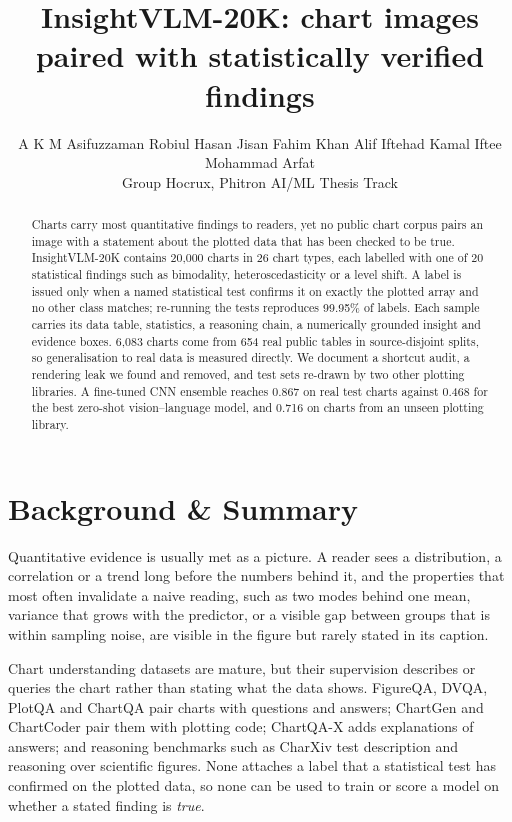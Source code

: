 \documentclass[11pt,a4paper]{article}
\title{\textbf{InsightVLM-20K: chart images paired with statistically verified findings}}
\author{A K M Asifuzzaman \quad Robiul Hasan Jisan \quad Fahim Khan Alif \quad Iftehad Kamal Iftee \quad Mohammad Arfat\\[0.3em]
\small Group Hocrux, Phitron AI/ML Thesis Track}
\date{}
\begin{document}
\maketitle

\begin{abstract}
\noindent
Charts carry most quantitative findings to readers, yet no public chart corpus pairs an
image with a statement about the plotted data that has been checked to be true.
InsightVLM-20K contains 20{,}000 charts in 26 chart types, each labelled with one of 20
statistical findings such as bimodality, heteroscedasticity or a level shift. A label is
issued only when a named statistical test confirms it on exactly the plotted array and no
other class matches; re-running the tests reproduces 99.95\% of labels. Each sample
carries its data table, statistics, a reasoning chain, a numerically grounded insight and
evidence boxes. 6{,}083 charts come from 654 real public tables in source-disjoint
splits, so generalisation to real data is measured directly. We document a shortcut
audit, a rendering leak we found and removed, and test sets re-drawn by two other
plotting libraries. A fine-tuned CNN ensemble reaches 0.867 on real test charts against
0.468 for the best zero-shot vision--language model, and 0.716 on charts from an unseen
plotting library.
\end{abstract}

\section*{Background \& Summary}

Quantitative evidence is usually met as a picture. A reader sees a distribution, a
correlation or a trend long before the numbers behind it, and the properties that most
often invalidate a naive reading, such as two modes behind one mean, variance that
grows with the predictor, or a visible gap between groups that is within sampling
noise, are visible in the figure but rarely stated in its caption.

Chart understanding datasets are mature, but their supervision describes or queries
the chart rather than stating what the data shows. FigureQA\cite{figureqa},
DVQA\cite{dvqa}, PlotQA\cite{plotqa} and ChartQA\cite{chartqa} pair charts with
questions and answers; ChartGen\cite{chartgen} and ChartCoder\cite{chartcoder} pair
them with plotting code; ChartQA-X\cite{chartqax} adds explanations of answers; and
reasoning benchmarks such as CharXiv\cite{charxiv} test description and reasoning
over scientific figures. None attaches a label that a statistical test has confirmed
on the plotted data, so none can be used to train or score a model on whether a
stated finding is \emph{true}.
\end{document}
